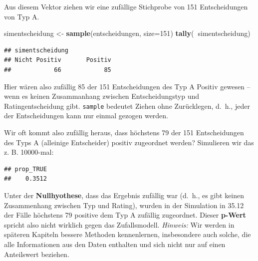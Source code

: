\documentclass[12pt,ngerman,paper=a4,pagesize,DIV=13]{scrreprt}
\newenvironment{Shaded}{\begin{snugshade}}{\end{snugshade}}
\newcommand{\DataTypeTok}[1]{\textcolor[rgb]{0.13,0.29,0.53}{#1}}
\newcommand{\DecValTok}[1]{\textcolor[rgb]{0.00,0.00,0.81}{#1}}
\newcommand{\KeywordTok}[1]{\textcolor[rgb]{0.13,0.29,0.53}{\textbf{#1}}}
\newcommand{\NormalTok}[1]{#1}
\newcommand{\OperatorTok}[1]{\textcolor[rgb]{0.81,0.36,0.00}{\textbf{#1}}}
\newcommand{\StringTok}[1]{\textcolor[rgb]{0.31,0.60,0.02}{#1}}
\begin{document}
Aus diesem Vektor ziehen wir eine zufällige Stichprobe von 151
Entscheidungen von Typ A.

\begin{Shaded}
\begin{Highlighting}[]
\NormalTok{simentscheidung <-}\StringTok{ }\KeywordTok{sample}\NormalTok{(entscheidungen, }\DataTypeTok{size=}\DecValTok{151}\NormalTok{)}
\KeywordTok{tally}\NormalTok{(}\OperatorTok{~}\NormalTok{simentscheidung)}
\end{Highlighting}
\end{Shaded}

\begin{verbatim}
## simentscheidung
## Nicht Positiv       Positiv 
##            66            85
\end{verbatim}

Hier wären also zufällig 85 der 151 Entscheidungen des Typ A Positiv
gewesen -- wenn es keinen Zusammanhang zwischen Entscheidungstyp und
Ratingentscheidung gibt. \texttt{sample} bedeutet Ziehen ohne
Zurücklegen, d.~h., jeder der Entscheidungen kann nur einmal gezogen
werden.

Wir oft kommt also zufällig heraus, dass höchstens 79 der 151
Entscheidungen des Typs A (alleinige Entscheider) positiv zugeordnet
werden? Simulieren wir das z. B. 10000-mal:

\begin{Shaded}
\end{Shaded}

\begin{verbatim}
## prop_TRUE 
##    0.3512
\end{verbatim}

Unter der \textbf{Nullhyothese}, dass das Ergebnis zufällig war (d.~h.,
es gibt keinen Zusammenhang zwischen Typ und Rating), wurden in der
Simulation in 35.12\(\,\) der Fälle höchstens 79 positive dem Typ A
zufällig zugeordnet. Dieser \textbf{p-Wert} spricht also nicht wirklich
gegen das Zufallsmodell. \emph{Hinweis:} Wir werden in späteren Kapiteln
bessere Methoden kennenlernen, insbesondere auch solche, die alle
Informationen aus den Daten enthalten und sich nicht nur auf einen
Anteilswert beziehen.
\end{document}

